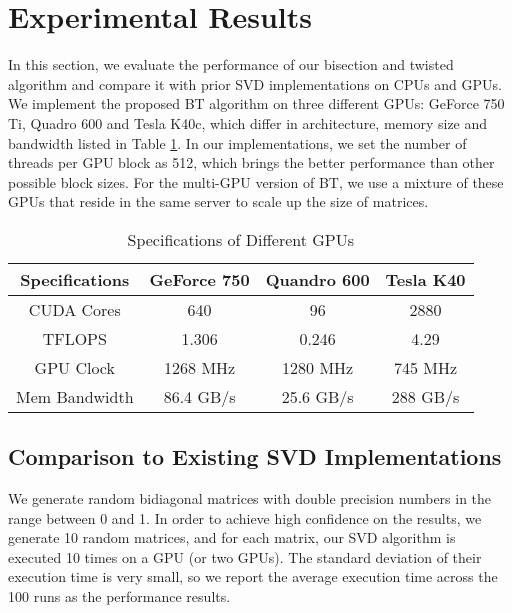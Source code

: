 \vspace{-0.1in}
\section{Experimental Results} \label{sec:results}
\vspace{-0.1in}
In this section, we evaluate the performance of our bisection and twisted algorithm and compare it with prior SVD implementations on CPUs and GPUs.
We implement the proposed BT algorithm on three different GPUs: GeForce 750 Ti, Quadro 600 and Tesla K40c,
which differ in architecture, memory size and bandwidth listed in Table \ref{tab:spec}. 
In our implementations, we set the number of threads per GPU block as 512, which brings the better performance than other possible block sizes.
For the multi-GPU version of BT, we use a mixture of these GPUs that reside in the same server to scale up the size of matrices. 
\begin{table}[h]
\vspace{-0.2in}
\caption{Specifications of Different GPUs}
\vspace{-0.1in}
\centering
\begin{tabular}{|c|c|c|c|}
\hline
Specifications & GeForce 750 & Quandro 600 & Tesla K40 \\ \hline
CUDA Cores     &         640 &          96 &      2880 \\ \hline
TFLOPS         &       1.306 &       0.246 &      4.29 \\ \hline
GPU Clock      &    1268 MHz &    1280 MHz &   745 MHz \\ \hline
Mem Bandwidth  &   86.4 GB/s &   25.6 GB/s &  288 GB/s \\ \hline
\end{tabular}
\label{tab:spec}
\vspace{-0.5in}
\end{table}

\subsection{Comparison to Existing SVD Implementations}
We generate random bidiagonal matrices with double precision numbers in the range between 0 and 1.
In order to achieve high confidence on the results, we generate 10 random matrices, and for each matrix, our SVD algorithm is executed 10 times on a GPU (or two GPUs).
The standard deviation of their execution time is very small, so we report the average execution time across the 100 runs as the performance results.


